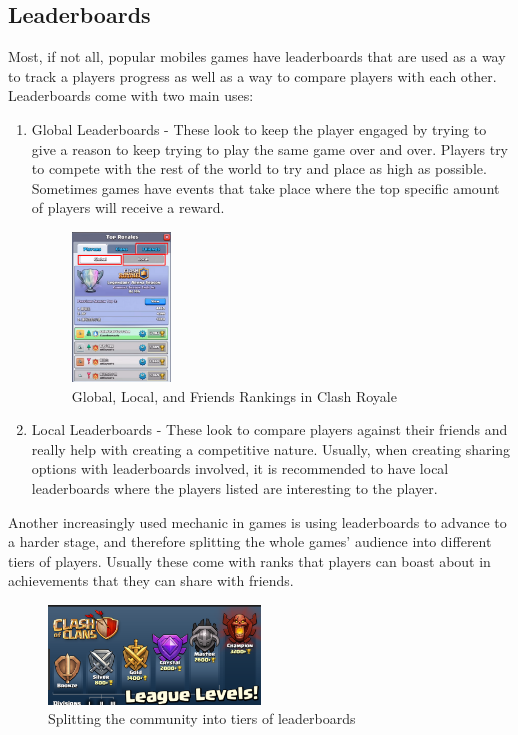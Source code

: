 \documentclass{article}
\begin{document}
\subsection{Leaderboards}
Most, if not all, popular mobiles games have leaderboards that are used as a way to track a players progress as well as a way to compare players with each other. Leaderboards come with two main uses:
\begin{enumerate}
\item Global Leaderboards - These look to keep the player engaged by trying to give a reason to keep trying to play the same game over and over. Players try to compete with the rest of the world to try and place as high as possible. Sometimes games have events that take place where the top specific amount of players will receive a reward.
\begin{figure}[h]
\centering
\includegraphics[height = 150px]{images/rankings2.png}
\caption{Global, Local, and Friends Rankings in Clash Royale}
\end{figure}
\item Local Leaderboards - These look to compare players against their friends and really help with creating a competitive nature. Usually, when creating sharing options with leaderboards involved, it is recommended to have local leaderboards where the players listed are interesting to the player.
\end{enumerate}
Another increasingly used mechanic in games is using leaderboards to advance to a harder stage, and therefore splitting the whole games' audience into different tiers of players. Usually these come with ranks that players can boast about in achievements that they can share with friends. 
\begin{figure}[h]
\centering
\includegraphics[height = 100px]{images/rankings.png}
\caption{Splitting the community into tiers of leaderboards}
\end{figure}
\end{document}
